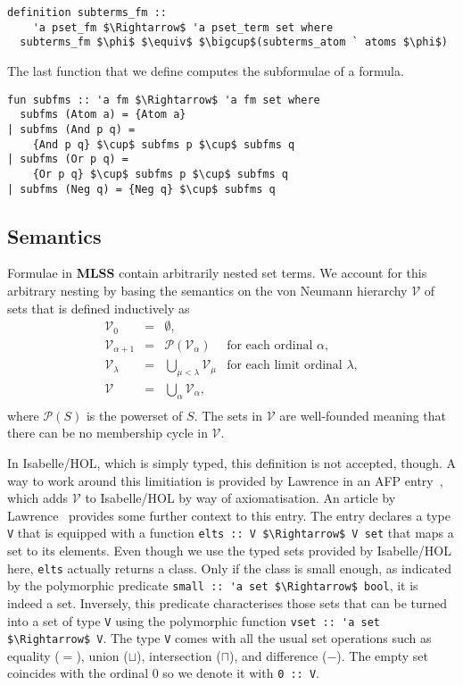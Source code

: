 \documentclass[sigplan,10pt,anonymous,review]{acmart}
\begin{document}
\begin{lstlisting}
definition subterms_fm ::
    'a pset_fm $\Rightarrow$ 'a pset_term set where
  subterms_fm $\phi$ $\equiv$ $\bigcup$(subterms_atom ` atoms $\phi$)
\end{lstlisting}
The last function that we define computes the subformulae of a formula.
\begin{lstlisting}
fun subfms :: 'a fm $\Rightarrow$ 'a fm set where
  subfms (Atom a) = {Atom a}
| subfms (And p q) =
    {And p q} $\cup$ subfms p $\cup$ subfms q
| subfms (Or p q) =
    {Or p q} $\cup$ subfms p $\cup$ subfms q
| subfms (Neg q) = {Neg q} $\cup$ subfms q
\end{lstlisting}

\subsection{Semantics}
Formulae in \textbf{MLSS} contain arbitrarily nested set terms.
We account for this arbitrary nesting by basing the semantics on the von Neumann hierarchy $\mathcal{V}$ of sets that is defined inductively as
  \[
    \begin{array}{rclr}
      \mathcal{V}_0 & = & \emptyset, \\
      \mathcal{V}_{\alpha + 1} & = & \mathcal{P}(\mathcal{V}_\alpha) & \text{for each ordinal $\alpha$}, \\
      \mathcal{V}_{\lambda} & = & \bigcup_{\mu < \lambda} \mathcal{V}_\mu & \text{for each limit ordinal $\lambda$}, \\
      \mathcal{V} & = & \bigcup_\alpha \mathcal{V}_\alpha, \\
    \end{array}
  \]
where $\mathcal{P}(S)$ is the powerset of $S$.
The sets in $\mathcal{V}$ are well-founded meaning that there can be no membership cycle in $\mathcal{V}$.

In Isabelle/HOL, which is simply typed, this definition is not accepted, though.
A way to work around this limitiation is provided by Lawrence in an AFP entry~\cite{zfc_in_hol_afp}, which adds $\mathcal{V}$ to Isabelle/HOL by way of axiomatisation.
An article by Lawrence~\cite{zfc_in_hol} provides some further context to this entry.
The entry declares a type \lstinline!V! that is equipped with a function \lstinline!elts :: V $\Rightarrow$ V set! that maps a set to its elements.
Even though we use the typed sets provided by Isabelle/HOL here, \lstinline!elts! actually returns a class.
Only if the class is small enough, as indicated by the polymorphic predicate \lstinline!small :: 'a set $\Rightarrow$ bool!, it is indeed a set.
Inversely, this predicate characterises those sets that can be turned into a set of type \lstinline!V! using the polymorphic function \lstinline!vset :: 'a set $\Rightarrow$ V!.
The type \lstinline!V! comes with all the usual set operations such as equality ($=$), union ($\sqcup$), intersection ($\sqcap$), and difference ($-$).
The empty set coincides with the ordinal $0$ so we denote it with \lstinline!0 :: V!.
\end{document}
